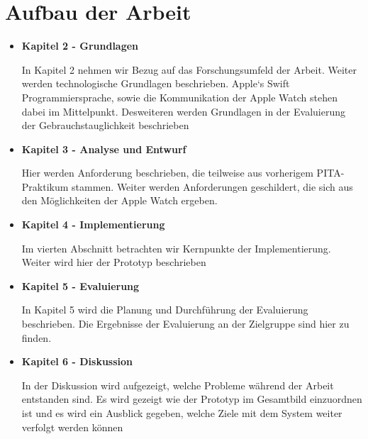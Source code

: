 \section{Aufbau der Arbeit}
\begin{itemize}
\item \textbf{Kapitel 2 - Grundlagen}
 
In Kapitel 2 nehmen wir Bezug auf das Forschungsumfeld der Arbeit. Weiter werden technologische Grundlagen beschrieben. Apple`s Swift Programmiersprache, sowie die Kommunikation der Apple Watch stehen dabei im Mittelpunkt. Desweiteren werden Grundlagen in der Evaluierung der Gebrauchstauglichkeit beschrieben
\item \textbf{Kapitel 3 - Analyse und Entwurf}

Hier werden Anforderung beschrieben, die teilweise aus vorherigem PITA-Praktikum stammen. Weiter werden Anforderungen geschildert, die sich aus den Möglichkeiten der Apple Watch ergeben.

\item \textbf{Kapitel 4 - Implementierung}

Im vierten Abschnitt betrachten wir Kernpunkte der Implementierung. Weiter wird hier der Prototyp beschrieben

\item \textbf{Kapitel 5 - Evaluierung}

In Kapitel 5 wird die Planung und Durchführung der Evaluierung beschrieben. Die  Ergebnisse der Evaluierung an der Zielgruppe sind hier zu finden.

\item \textbf{Kapitel 6 - Diskussion}

In der Diskussion wird aufgezeigt, welche Probleme während der Arbeit entstanden sind. Es wird gezeigt wie der Prototyp im Gesamtbild einzuordnen ist und es wird ein Ausblick gegeben, welche Ziele mit dem System weiter verfolgt werden können
\end{itemize}

